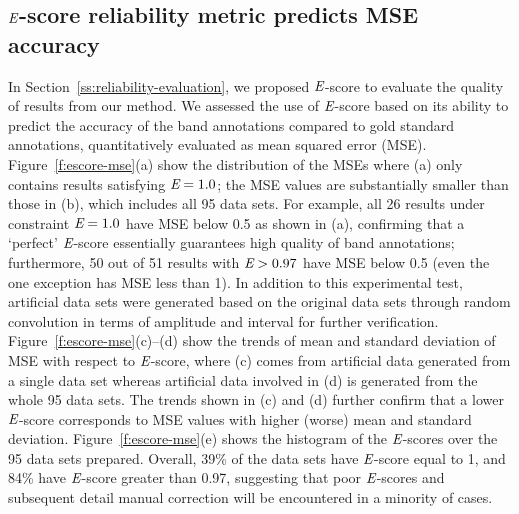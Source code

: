 \subsection{${\emph{E}}$-score reliability metric predicts MSE accuracy}

In Section~\ref{ss:reliability-evaluation}, we proposed ${\emph{E}}$-score to evaluate the quality of results from our method. We assessed the use of ${\emph{E}}$-score based on its ability to predict the accuracy of the band annotations compared to gold standard annotations, quantitatively evaluated as mean squared error (MSE). Figure~\ref{f:escore-mse}(a) show the distribution of the MSEs where (a) only contains results satisfying ${\emph{E}} = 1.0$; the MSE values are substantially smaller than those in (b), which includes all 95 data sets.  For example, all 26 results under constraint ${\emph{E}}=1.0$ have MSE below 0.5 as shown in (a), confirming that a `perfect' ${\emph{E}}$-score essentially guarantees high quality of band annotations; furthermore, 50 out of 51 results with ${\emph{E}}>0.97$ have MSE below 0.5 (even the one exception has MSE less than 1). In addition to this experimental test, artificial data sets were generated based on the original data sets through random convolution in terms of amplitude and interval for further verification. Figure~\ref{f:escore-mse}(c)--(d) show the trends of mean and standard deviation of MSE with respect to ${\emph{E}}$-score, where (c) comes from artificial data generated from a single data set whereas artificial data involved in (d) is generated from the whole 95 data sets. The trends shown in (c) and (d) further confirm that a lower ${\emph{E}}$-score corresponds to MSE values with higher (worse) mean and standard deviation. Figure~\ref{f:escore-mse}(e) shows the histogram of the ${\emph{E}}$-scores over the 95 data sets prepared. Overall, 39\%  of the data sets have ${\emph{E}}$-score equal to 1, and 84\%  have ${\emph{E}}$-score greater than 0.97, suggesting that poor ${\emph{E}}$-scores and subsequent detail manual correction will be encountered in a minority of cases.

